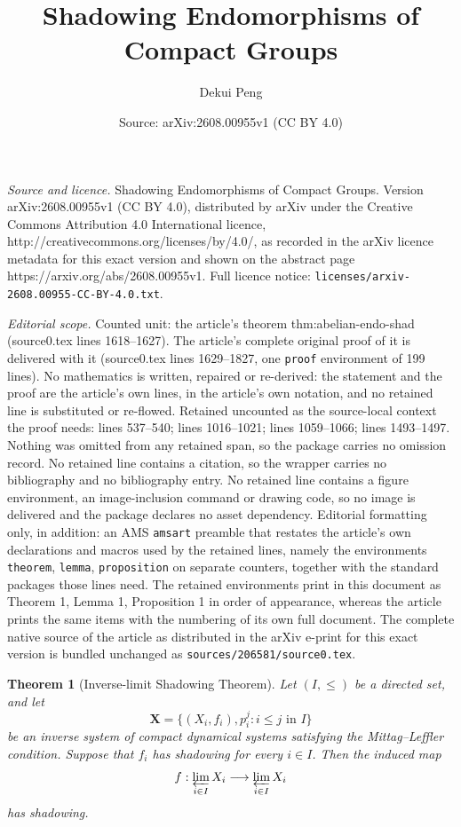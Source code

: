 \documentclass[10pt,a4paper]{amsart}
\title{Shadowing Endomorphisms of Compact Groups}
\author{Dekui Peng}
\date{Source: arXiv:2608.00955v1 (CC BY 4.0)}
\newtheorem{theorem}{Theorem}
\begin{document}
\maketitle

\noindent\emph{Source and licence.} Shadowing Endomorphisms of Compact Groups. Version arXiv:2608.00955v1 (CC BY 4.0), distributed by arXiv under the Creative Commons Attribution 4.0 International licence, http://creativecommons.org/licenses/by/4.0/, as recorded in the arXiv licence metadata for this exact version and shown on the abstract page https://arxiv.org/abs/2608.00955v1. Full licence notice: \texttt{licenses/arxiv-2608.00955-CC-BY-4.0.txt}.\par\smallskip

\noindent\textit{Editorial scope.} Counted unit: the article's theorem thm:abelian-endo-shad (source0.tex lines 1618--1627). The article's complete original proof of it is delivered with it (source0.tex lines 1629--1827, one \texttt{proof} environment of 199 lines). No mathematics is written, repaired or re-derived: the statement and the proof are the article's own lines, in the article's own notation, and no retained line is substituted or re-flowed.  Retained uncounted as the source-local context the proof needs: lines 537--540; lines 1016--1021; lines 1059--1066; lines 1493--1497.  Nothing was omitted from any retained span, so the package carries no omission record.  No retained line contains a citation, so the wrapper carries no bibliography and no bibliography entry.  No retained line contains a figure environment, an image-inclusion command or drawing code, so no image is delivered and the package declares no asset dependency.  Editorial formatting only, in addition: an AMS \texttt{amsart} preamble that restates the article's own declarations and macros used by the retained lines, namely the environments \texttt{theorem}, \texttt{lemma}, \texttt{proposition} on separate counters, together with the standard packages those lines need.  The retained environments print in this document as Theorem 1, Lemma 1, Proposition 1 in order of appearance, whereas the article prints the same items with the numbering of its own full document.  The complete native source of the article as distributed in the arXiv e-print for this exact version is bundled unchanged as \texttt{sources/206581/source0.tex}.
\begin{theorem}[Inverse-limit Shadowing Theorem]\label{thm:inverse-limit-shadowing}
 Let $(I,\leq)$ be a directed set, and let \[ \mathbf X = \bigl\{(X_i,f_i),p_i^j:i\leq j\text{ in }I\bigr\} \] be an inverse system of compact dynamical systems satisfying the Mittag--Leffler condition. 
 Suppose that $f_i$ has shadowing for every $i\in I$. Then the induced map \[ f:\varprojlim_{i\in I}X_i\longrightarrow \varprojlim_{i\in I}X_i \] has shadowing. 
 \end{theorem}
\end{document}

